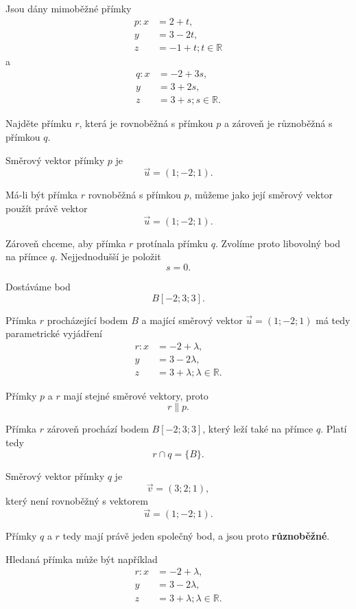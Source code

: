 \begin{example}
    \label{exa:Line_intersecting_q_parallel_p}

    Jsou dány mimoběžné přímky
    \[
        \begin{aligned}
            p: x&=2+t,\\
            y&=3-2t,\\
            z&=-1+t; t\in\mathbb{R}
        \end{aligned}
    \]
    a
    \[
        \begin{aligned}
            q: x&=-2+3s,\\
            y&=3+2s,\\
            z&=3+s; s\in\mathbb{R}.
        \end{aligned}
    \]

    Najděte přímku $r$, která je rovnoběžná s přímkou $p$
    a zároveň je různoběžná s přímkou $q$.

    Směrový vektor přímky $p$ je
    \[
        \vec{u}=(1;-2;1).
    \]

    Má-li být přímka $r$ rovnoběžná s přímkou $p$, můžeme jako její
    směrový vektor použít právě vektor
    \[
        \vec{u}=(1;-2;1).
    \]

    Zároveň chceme, aby přímka $r$ protínala přímku $q$.
    Zvolíme proto libovolný bod na přímce $q$.
    Nejjednodušší je položit
    \[
        s=0.
    \]

    Dostáváme bod
    \[
        B[-2;3;3].
    \]

    Přímka $r$ procházející bodem $B$ a mající směrový vektor
    $\vec{u}=(1;-2;1)$ má tedy parametrické vyjádření
    \[
        \begin{aligned}
            r: x&=-2+\lambda,\\
            y&=3-2\lambda,\\
            z&=3+\lambda; \lambda\in\mathbb{R}.
        \end{aligned}
    \]

    Přímky $p$ a $r$ mají stejné směrové vektory, proto
    \[
        r\parallel p.
    \]

    Přímka $r$ zároveň prochází bodem $B[-2;3;3]$, který leží také
    na přímce $q$. Platí tedy
    \[
        r\cap q=\{B\}.
    \]

    Směrový vektor přímky $q$ je
    \[
        \vec{v}=(3;2;1),
    \]
    který není rovnoběžný s vektorem
    \[
        \vec{u}=(1;-2;1).
    \]

    Přímky $q$ a $r$ tedy mají právě jeden společný bod, a jsou proto
    \textbf{různoběžné}.

    Hledaná přímka může být například
    \[
        \begin{aligned}
            r: x&=-2+\lambda,\\
            y&=3-2\lambda,\\
            z&=3+\lambda; \lambda\in\mathbb{R}.
        \end{aligned}
    \]
\end{example}

